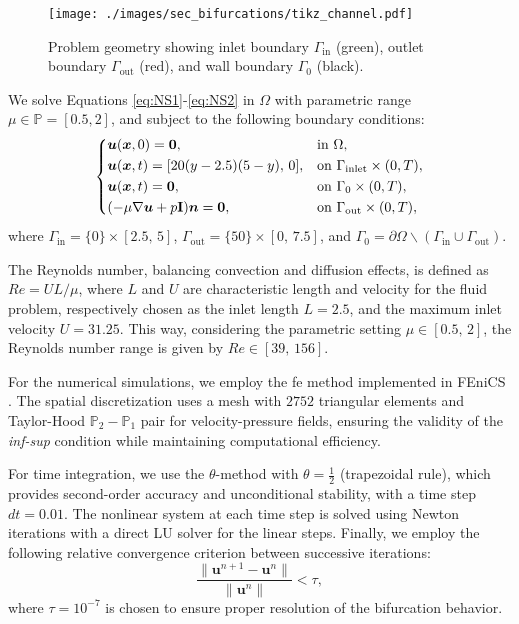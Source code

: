 \documentclass[reqno]{amsart}[standalone]
\theoremstyle{definition}
\theoremstyle{remark}
\newcommand{\bs}{\boldsymbol}
\begin{document}
\begin{figure}[ht]
    \centering
    \texttt{[image: ./images/sec\_bifurcations/tikz\_channel.pdf]}
    \caption{Problem geometry showing inlet boundary $\Gamma_\text{in}$ (green), outlet boundary $\Gamma_\text{out}$ (red), and wall boundary $\Gamma_0$ (black).}
    \label{figMesh}
\end{figure}

We solve Equations \eqref{eq:NS1}-\eqref{eq:NS2} in $\Omega$ with parametric range $\mu\in\mathbb{P}=[0.5, 2]$, and subject to the following boundary conditions:
\begin{equation}\label{eq:bc_coanda}
    \begin{dcases}
    \bs{u}(\bs{x}, 0) = \bs{0}, &\text{in } \Omega, \\
    \bs{u}(\bs{x}, t) = [20(y - 2.5)(5 - y),\, 0], &\text{on } \Gamma_{\text{inlet}}\times(0,T), \\
    \bs{u}(\bs{x}, t) = \bs{0}, &\text{on } \Gamma_0\times(0,T), \\
    (-\mu\nabla\bs{u} + p\mathbf{I})\bs{n} = \bs{0}, &\text{on } \Gamma_{\text{out}}\times(0,T),
    \end{dcases}
\end{equation}
where $\Gamma_{\text{in}}=\{0\}\times [2.5,\,5]$, $\Gamma_{\text{out}} = \{50\}\times[0,\, 7.5]$, and $\Gamma_0 = \partial\Omega\smallsetminus(\Gamma_{\text{in}}\cup\Gamma_{\text{out}})$.


The Reynolds number, balancing convection and diffusion effects, is defined as $Re = UL/\mu$, where $L$ and $U$ are characteristic length and velocity for the fluid problem,
%
%
%
respectively chosen as the inlet length $L=2.5$, and the maximum inlet velocity $U=31.25$. This way, considering the parametric setting $\mu\in[0.5,\,2]$, the Reynolds number range is given by $Re\in[39,\, 156]$.


For the numerical simulations, we employ the \gls{fe} method implemented in FEniCS \parencite{LoggEtal_2012}. The spatial discretization uses a mesh with $2752$ triangular elements and Taylor-Hood $\mathbb{P}_2-\mathbb{P}_1$ pair for velocity-pressure fields, ensuring the validity of the \textit{inf-sup} condition \parencite{Rozza_2007} while maintaining computational efficiency.
%

For time integration, we use the $\theta$-method with $\theta = \frac{1}{2}$ (trapezoidal rule), which provides second-order accuracy and unconditional stability, with a time step $dt = 0.01$. The nonlinear system at each time step is solved using Newton iterations with a direct LU solver for the linear steps.
Finally, we employ the following relative convergence criterion between successive iterations:
\begin{equation}\label{eqSTOP}
\frac{\|\bs{u}^{n+1}-\bs{u}^n\|}{\|\bs{u}^n\|}<\tau,
\end{equation}
where $\tau=10^{-7}$ is chosen to ensure proper resolution of the bifurcation behavior.
\end{document}
